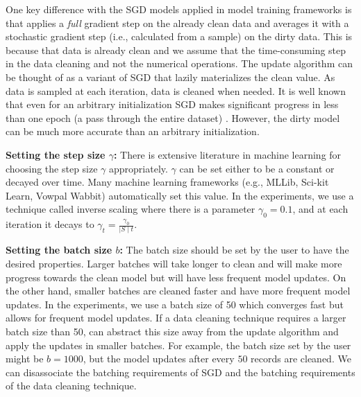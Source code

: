 One key difference with the SGD models applied in model training frameworks is that \sys applies a \emph{full} gradient step on the already clean data and averages it with a stochastic gradient step (i.e., calculated from a sample) on the dirty data. 
This is because that data is already clean and we assume that the time-consuming step in the data cleaning and not the numerical operations.
The update algorithm can be thought of as a variant of SGD that lazily materializes the clean value.
As data is sampled at each iteration, data is cleaned when needed.
It is well known that even for an arbitrary initialization SGD makes significant progress in less than one epoch (a pass through the entire dataset) \cite{bottou2012stochastic}.
However, the dirty model can be much more accurate than an arbitrary initialization.

\vspace{0.25em}

\noindent\textbf{ Setting the step size $\gamma$: } There is extensive literature in machine learning for choosing the step size $\gamma$ appropriately. $\gamma$ can be set either to be a constant or decayed over time. Many machine learning frameworks (e.g., MLLib, Sci-kit Learn, Vowpal Wabbit) automatically set this value. 
In the experiments, we use a technique called inverse scaling where there is a parameter $\gamma_0=0.1$, and at each iteration it decays to $\gamma_t = \frac{\gamma_0}{\mid S \mid t}$. 

\vspace{0.25em}

\noindent\textbf{ Setting the batch size $b$: } The batch size should be set by the user to have the desired properties.
Larger batches will take longer to clean and will make more progress towards the clean model but will have less frequent model updates.
On the other hand, smaller batches are cleaned faster and have more frequent model updates.
In the experiments, we use a batch size of 50 which converges fast but allows for frequent model updates.
If a data cleaning technique requires a larger batch size than 50, \sys can abstract this size away from the update algorithm and apply the updates in smaller batches.
For example, the batch size set by the user might be $b=1000$, but the model updates after every $50$ records are cleaned.
We can disassociate the batching requirements of SGD and the batching requirements of the data cleaning technique.

